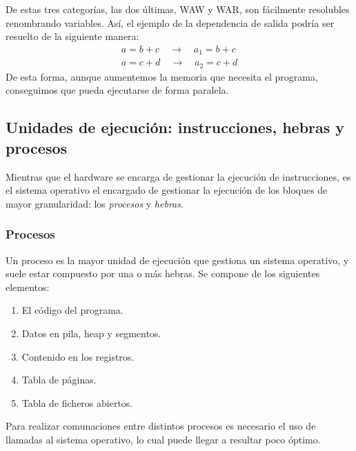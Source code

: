\documentclass[11pt,twoside,titlepage,a4paper]{article}
\begin{document}
De estas tres categorías, las dos últimas, WAW y WAR, son fácilmente resolubles renombrando variables.
Así, el ejemplo de la dependencia de salida podría ser resuelto de la siguiente manera:
\begin{gather*}
	a = b + c \quad\to\quad a_1 = b + c\\
	a = c + d \quad\to\quad a_2 = c + d
\end{gather*}
De esta forma, aunque aumentemos la memoria que necesita el programa, conseguimos que pueda ejecutarse de
forma paralela.

\subsection{Unidades de ejecución: instrucciones, hebras y procesos}

Mientras que el hardware se encarga de gestionar la ejecución de instrucciones, es el sistema operativo el
encargado de gestionar la ejecución de los bloques de mayor granularidad: los \textit{procesos} y 
\textit{hebras}.

\subsubsection*{Procesos}

Un proceso es la mayor unidad de ejecución que gestiona un sistema operativo, y suele estar compuesto por
una o más hebras. Se compone de los siguientes elementos:
\begin{enumerate}[noitemsep]
	\item El código del programa.
	\item Datos en pila, heap y segmentos.
	\item Contenido en los registros.
	\item Tabla de páginas.
	\item Tabla de ficheros abiertos.
\end{enumerate}
Para realizar comunaciones entre distintos procesos es necesario el uso de llamadas al sistema operativo,
lo cual puede llegar a resultar poco óptimo.
\end{document}
